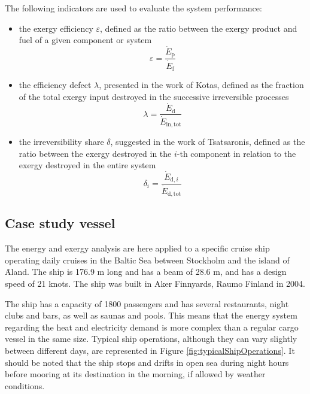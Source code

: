 \documentclass[preprint,12pt]{elsarticle}
\begin{document}
The following indicators are used to evaluate the system performance:
\begin{itemize}
	\item the exergy efficiency $\varepsilon$, defined as the ratio between the exergy product and fuel of a given component or system
	\begin{equation} \varepsilon = \frac{\dot{E}_{\mathrm{p}}}{\dot{E}_{\mathrm{f}}} \end{equation}
	\item the efficiency defect $\lambda$, presented in the work of Kotas, defined as the fraction of the total exergy input destroyed in the successive irreversible processes
	\begin{equation} \lambda = \frac{\dot{E}_{\mathrm{d}}}{\dot{E}_{\mathrm{in,tot}}} \end{equation}
	\item  the irreversibility share $\delta$, suggested in the work of Tsatsaronis, defined as the ratio between the exergy destroyed in the $i$-th component in relation to the exergy destroyed in the entire system
	\begin{equation} \delta_i = \frac{\dot{E}_{\mathrm{d},i}}{\dot{E}_{\mathrm{d,tot}}} \end{equation}
	
\end{itemize}    








\subsection{Case study vessel} \label{sec:met:case}

The energy and exergy analysis are here applied to a specific  cruise ship operating daily cruises in the Baltic Sea between Stockholm and the island of \.{A}land. The ship is 176.9 m long and has a beam of 28.6 m, and has a design speed of 21 knots. The ship was built in Aker Finnyards, Raumo Finland in 2004.

The ship has a capacity of 1800 passengers and has several restaurants, night clubs and bars, as well as saunas and pools. This means that the energy system regarding the heat and electricity demand is more complex than a regular cargo vessel in the same size. Typical ship operations, although they can vary slightly between different days, are represented in Figure \ref{fig:typicalShipOperations}. It should be noted that the ship stops and drifts in open sea during night hours before mooring at its destination in the morning, if allowed by weather conditions.
\end{document}
